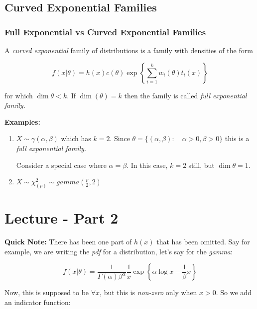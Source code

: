 \documentclass{article}
\begin{document}
\begin{enumerate}
    \subsection{Curved Exponential Families}
    \subsubsection{Full Exponential vs Curved Exponential Families}
    
    A \textit{curved exponential} family of distributions is a family with densities of the form
    
    \begin{equation*}
        f(x|\theta) = h(x) c(\theta) \exp \left\{\sum_{i=1}^k w_i(\theta)t_i(x) \right\}
    \end{equation*}
    
    for which $\dim \theta < k$. If $\dim(\theta) = k$ then the family is called \textit{full exponential family.}
    
    \noindent \textbf{Examples:}
    \begin{enumerate}
        \item $X \sim \gamma(\alpha,\beta)$ which has $k=2$. Since $\theta = \{ (\alpha, \beta): \quad \alpha>0,\beta>0\}$ this is a \textit{full exponential family}. 
    
        Consider a special case where $\alpha = \beta$. In this case, $k=2$ still, but $\dim \theta = 1$.
        
        \item $X \sim \chi_{(p)}^2 \sim gamma(\frac{p}{2},2)$ 
    \end{enumerate}
    
\end{enumerate}

\section{Lecture - Part 2}

\textbf{Quick Note:} There has been one part of $h(x)$ that has been omitted. Say for example, we are writing the \textit{pdf} for a distribution, let's say for the \textit{gamma}:

\begin{equation*}
    f(x|\theta) = \frac{1}{\Gamma(\alpha)\beta^\alpha} \frac{1}{x} \exp \left\{\alpha \log x - \frac{1}{\beta} x \right\}    
\end{equation*}

\noindent Now, this is supposed to be $\forall x$, but this is \textit{non-zero} only when $x>0$. So we add an indicator function:
\end{document}
